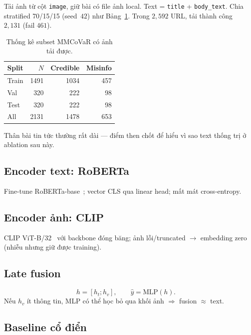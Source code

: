 \documentclass[12pt, a4paper]{report}
\begin{document}
Tải ảnh từ cột \texttt{image}, giữ bài có file ảnh local.
Text = \texttt{title} + \texttt{body\_text}.
Chia stratified 70/15/15 (seed~$42$) như Bảng~\ref{tab:mmcovar-stats}.
Trong $2{,}592$ URL, tải thành công $2{,}131$ (fail $461$).

\begin{table}[htbp]
\centering
\caption{Thống kê subset MMCoVaR có ảnh tải được.}
\label{tab:mmcovar-stats}
\begin{tabular}{lrrr}
\hline
Split & $N$ & Credible & Misinfo \\
\hline
Train & 1491 & 1034 & 457 \\
Val   & 320 & 222 & 98 \\
Test  & 320 & 222 & 98 \\
\hline
All   & 2131 & 1478 & 653 \\
\hline
\end{tabular}
\end{table}

Thân bài tin tức thường rất dài --- điểm then chốt để hiểu vì sao text thống trị ở ablation sau này.

\subsection{Encoder text: RoBERTa}

Fine-tune RoBERTa-base~\cite{liu2019roberta}; vector CLS qua linear head; mất mát cross-entropy.

\subsection{Encoder ảnh: CLIP}

CLIP ViT-B/32~\cite{radford2021clip} với backbone đóng băng; ảnh lỗi/truncated $\rightarrow$ embedding zero (nhiễu nhưng giữ được training).

\subsection{Late fusion}

\begin{equation}
h = [h_t; h_v], \qquad \hat{y}=\mathrm{MLP}(h).
\end{equation}
Nếu $h_v$ ít thông tin, MLP có thể học bỏ qua khối ảnh $\Rightarrow$ fusion $\approx$ text.

\subsection{Baseline cổ điển}
\end{document}
